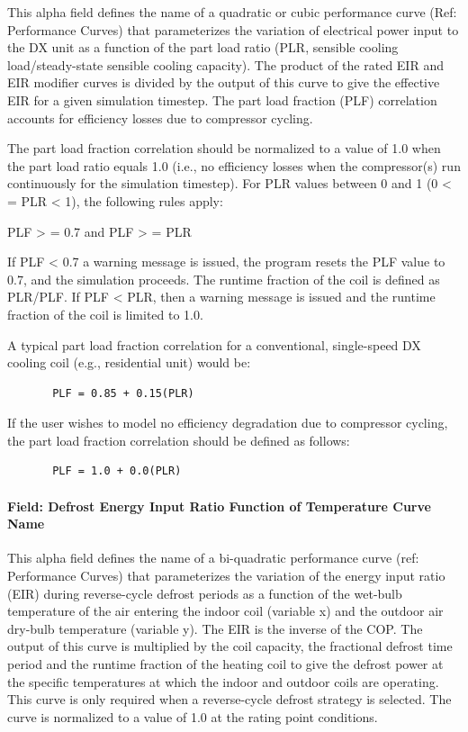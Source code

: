 This alpha field defines the name of a quadratic or cubic performance curve (Ref: Performance Curves) that parameterizes the variation of electrical power input to the DX unit as a function of the part load ratio (PLR, sensible cooling load/steady-state sensible cooling capacity). The product of the rated EIR and EIR modifier curves is divided by the output of this curve to give the effective EIR for a given simulation timestep. The part load fraction (PLF) correlation accounts for efficiency losses due to compressor cycling.

The part load fraction correlation should be normalized to a value of 1.0 when the part load ratio equals 1.0 (i.e., no efficiency losses when the compressor(s) run continuously for the simulation timestep). For PLR values between 0 and 1 (0 \textless{} = PLR \textless{} 1), the following rules apply:

PLF \textgreater{} = 0.7 and PLF \textgreater{} = PLR

If PLF \textless{} 0.7 a warning message is issued, the program resets the PLF value to 0.7, and the simulation proceeds. The runtime fraction of the coil is defined as PLR/PLF. If PLF \textless{} PLR, then a warning message is issued and the runtime fraction of the coil is limited to 1.0.

A typical part load fraction correlation for a conventional, single-speed DX cooling coil (e.g., residential unit) would be:

\begin{lstlisting}
       PLF = 0.85 + 0.15(PLR)
\end{lstlisting}

If the user wishes to model no efficiency degradation due to compressor cycling, the part load fraction correlation should be defined as follows:

\begin{lstlisting}
       PLF = 1.0 + 0.0(PLR)
\end{lstlisting}

\paragraph{Field: Defrost Energy Input Ratio Function of Temperature Curve Name}\label{field-defrost-energy-input-ratio-function-of-temperature-curve-name}

This alpha field defines the name of a bi-quadratic performance curve (ref: Performance Curves) that parameterizes the variation of the energy input ratio (EIR) during reverse-cycle defrost periods as a function of the wet-bulb temperature of the air entering the indoor coil (variable x) and the outdoor air dry-bulb temperature (variable y). The EIR is the inverse of the COP. The output of this curve is multiplied by the coil capacity, the fractional defrost time period and the runtime fraction of the heating coil to give the defrost power at the specific temperatures at which the indoor and outdoor coils are operating. This curve is only required when a reverse-cycle defrost strategy is selected. The curve is normalized to a value of 1.0 at the rating point conditions.

